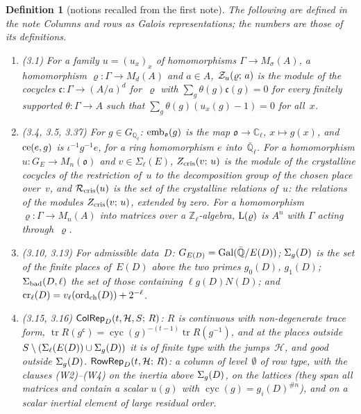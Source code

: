 \documentclass[11pt,a4paper]{article}
\newcommand{\Gal}{\operatorname{Gal}}
\newcommand{\m}[1]{\mbox{$#1$}}        %
\theoremstyle{plainx}
\theoremstyle{uprightx}
\newtheorem{definition}[theorem]{Definition}
\newcommand{\Qb}{\bar{\mathbb{Q}}}
\newcommand{\Zl}{\mathbb{Z}_\ell}
\newcommand{\Qlb}{\bar{\mathbb{Q}}_\ell}
\newcommand{\Cl}{\mathbb{C}_\ell}
\newcommand{\Gl}{G_{\mathbb{Q}_\ell}}
\newcommand{\GE}[1]{G_{#1}}
\newcommand{\cyc}{\operatorname{cyc}}
\newcommand{\pd}[2]{\Sigma_{#2}(#1)}
\newcommand{\fo}{\mathfrak{o}}
\newcommand{\HT}{\mathcal{H}}
\newcommand{\tr}{\operatorname{tr}}
\newcommand{\ED}[1]{E(#1)}
\newcommand{\Dg}[2]{g_{#1}(#2)}
\newcommand{\gD}[1]{g(#1)}
\newcommand{\lvl}[1]{N(#1)}
\newcommand{\ordch}[1]{\operatorname{ord}_{\mathrm{ch}}(#1)}
\begin{document}
\begin{definition}[notions recalled from the first note]\label{d:recall}
The following are defined in the note \emph{Columns and rows as Galois representations}; the numbers are those
of its definitions.
\begin{enumerate}[label=\textup{(\arabic*)},leftmargin=2.3em,itemsep=2pt]
\item (3.1) For a family \m{u=(u_x)_x} of homomorphisms \m{\Gamma\to M_\sigma(A)}, a homomorphism
\m{\varrho\colon\Gamma\to M_d(A)} and \m{a\in A}, \m{\obeyingCocycles{u}{\varrho}{a}} is the module of the cocycles
\m{\mathfrak{c}\colon\Gamma\to(A/a)^d} for~$\varrho$ with \m{\sum_g\theta(g)\mathfrak{c}(g)=0} for every finitely supported
\m{\theta\colon\Gamma\to A} such that \m{\sum_g\theta(g)(u_x(g)-1)=0} for all~$x$.
\item (3.4, 3.5, 3.37) For \m{g\in\Gl}: \m{\coeffEmb{\fo}{g}} is the map \m{\fo\to\Cl}, \m{x\mapsto g(x)}, and
\m{\complexEmbOf{e}{g}} is \m{\iota^{-1}g^{-1}e}, for a ring homomorphism $e$ into~\m{\Qlb}. For a homomorphism
\m{u\colon\GE{E}\to M_n(\fo)} and \m{v\in\pd{E}{\ell}}, \m{\ZfAt{v}{u}} is the module of the crystalline cocycles of the
restriction of~$u$ to the decomposition group of the chosen place over~$v$, and \m{\crysRels{u}} is the set of the
crystalline relations of~$u$: the relations of the modules \m{\ZfAt{v}{u}}, extended by zero. For a homomorphism
\m{\varrho\colon\Gamma\to M_n(A)} into matrices over a \m{\Zl}-algebra, \m{\matrixLattice{\varrho}} is $A^n$ with
$\Gamma$ acting through~$\varrho$.
\item (3.10, 3.13) For admissible data~$D$: \m{\AbsGal{D}=\Gal(\Qb/\ED{D})}; \m{\placesAboveG{D}} is the set of the finite
places of~\m{\ED{D}} above the two primes \m{\Dg{0}{D}}, \m{\Dg{1}{D}}; \m{\badPlaces{D}{\ell}} the set of those
containing \m{\ell\gD{D}\lvl{D}}; and \m{\crudeUnit{\ell}{D}=v_\ell(\ordch{D})+2^{-\ell}}.
\item (3.15, 3.16) \m{\IsColumn{D}{t}{\HT}{S}{R}}: $R$ is continuous with non-degenerate trace form,
\m{\tr R(g^{\mathsf c})=\cyc(g)^{-(t-1)}\tr R(g^{-1})}, and at the places outside
\m{S\setminus(\pd{\ED{D}}{\ell}\cup\placesAboveG{D})} it is of finite type with the jumps~$\HT$, and good outside
\m{\placesAboveG{D}}. \m{\IsRow{D}{t}{\HT}{R}}: a column of level~$\emptyset$ of row type, with the clauses (W2)--(W4)
on the inertia above \m{\placesAboveG{D}}, on the lattices (they span all matrices and contain a scalar \m{u(g)}
with \m{\cyc(g)=\Dg{i}{D}^{\#n}}), and on a scalar inertial element of large residual order.

\end{enumerate}
\end{definition}
\end{document}
